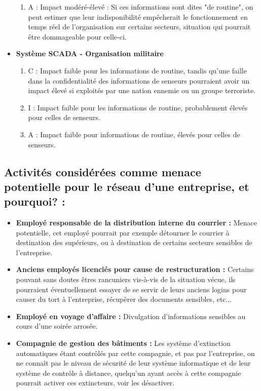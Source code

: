 \documentclass{report}
\begin{document}
\begin{itemize}
\begin{enumerate}
						\item A : Impact modéré-élevé : Si ces informations sont dites "de routine", on peut estimer que leur indisponibilité empêcherait le fonctionnement en temps réel de l'organisation sur certains secteurs, situation qui pourrait être dommageable pour celle-ci.\\
					\end{enumerate}
				\item \textbf{Système SCADA - Organisation militaire}
					\begin{enumerate}
						\item C : Impact faible pour les informations de routine, tandis qu'une faille dans la confidentialité des informations de senseurs pourraient avoir un impact élevé si exploités par une nation ennemie ou un groupe terroriste.\\
						\item I : Impact faible pour les informations de routine, probablement élevés pour celles de senseurs.\\
						\item A : Impact faible pour informations de routine, élevés pour celles de senseurs.\\
					\end{enumerate}
			\end{itemize}

		\subsection{Activités considérées comme menace potentielle pour le réseau d'une entreprise, et pourquoi? : }

			\begin{itemize}
				\item \textbf{Employé responsable de la distribution interne du courrier : } Menace potentielle, cet employé pourrait par exemple détourner le courrier à destination des supérieurs, ou à destination de certains secteurs sensibles de l'entreprise.\\
				\item \textbf{Anciens employés licenciés pour cause de restructuration : } Certains pouvant sans doutes êtres rancuniers vis-à-vis de la situation vécue, ils pourraient éventuellement essayer de se servir de leurs anciens logins pour causer du tort à l'entreprise, récupèrer des documents sensibles, etc...
				\item \textbf{Employé en voyage d'affaire : } Divulgation d'informations sensibles au cours d'une soirée arrosée.\\
				\item \textbf{Compagnie de gestion des bâtiments : } Les système d'extinction automatiques étant contrôlés par cette compagnie, et pas par l'entreprise, on ne connaît pas le niveau de sécurité de leur système informatique et de leur système de contrôle à distance, quelqu'un ayant accès à cette compagnie pourrait activer ces extincteurs, voir les désactiver.\\
			\end{itemize}
\end{document}
